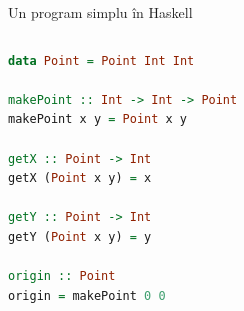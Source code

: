 \documentclass[xcolor=pdftex,romanian,colorlinks]{beamer}
\begin{document}
\begin{frame}[fragile]{Un program simplu în  Haskell}

\begin{columns}
\begin{column}{0.55\textwidth}
\begin{lstlisting}[language=Haskell]
data Point = Point Int Int

makePoint :: Int -> Int -> Point
makePoint x y = Point x y

getX :: Point -> Int
getX (Point x y) = x

getY :: Point -> Int
getY (Point x y) = y

origin :: Point
origin = makePoint 0 0
\end{lstlisting}

\end{column}
\begin{column}{0.43\textwidth}
\end{column}
\end{columns}
\end{frame}
\end{document}
